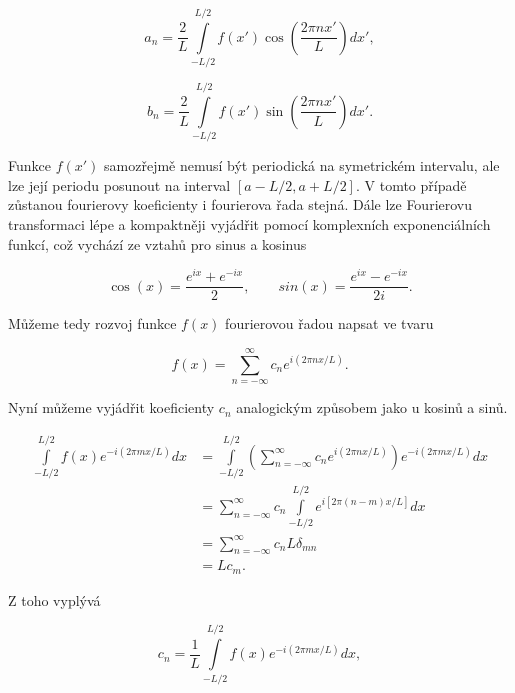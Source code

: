 \begin{equation}
a_n = \frac{2}{L} \int\limits_{-L/2}^{L/2} f(x') \cos \left( \frac{2 \pi n x'}{L} \right) dx',
\end{equation}

\begin{equation}
b_n = \frac{2}{L} \int\limits_{-L/2}^{L/2} f(x') \sin \left( \frac{2 \pi n x'}{L} \right) dx'.
\end{equation}

Funkce $f(x')$ samozřejmě nemusí být periodická na symetrickém intervalu, ale lze její periodu posunout na interval $[a-L/2,a+L/2]$. V tomto případě zůstanou fourierovy koeficienty i fourierova řada stejná. Dále lze Fourierovu transformaci lépe a kompaktněji vyjádřit pomocí komplexních exponenciálních funkcí, což vychází ze vztahů pro sinus a kosinus

\begin{equation}
\cos(x) = \frac{e^{ix} + e^{-ix}}{2}, \qquad sin(x) = \frac{e^{ix} - e^{-ix}}{2i}.
\end{equation}

Můžeme tedy rozvoj funkce $f(x)$ fourierovou řadou napsat ve tvaru

\begin{equation}\label{eq:fourier_rada}
f(x) = \sum\limits_{n=-\infty}^{\infty} c_n e^{i (2 \pi n x/L) }.
\end{equation}

Nyní můžeme vyjádřit koeficienty $c_n$ analogickým způsobem jako u kosinů a sinů.

\begin{equation}
\begin{aligned}
\int\limits_{-L/2}^{L/2} f(x) e^{-i (2 \pi m x/L)} dx & = \int\limits_{-L/2}^{L/2} \left(\sum\limits_{n=-\infty}^{\infty} c_n e^{i(2 \pi n x/L)} \right) e^{-i (2 \pi m x/L)} dx \\
& = \sum\limits_{n=-\infty}^{\infty} c_n \int\limits_{-L/2}^{L/2} e^{i[2 \pi (n-m) x/L]} dx \\
& = \sum\limits_{n=-\infty}^{\infty} c_n L \delta_{mn} \\
& = L c_m.
\end{aligned}
\end{equation}

Z toho vyplývá

\begin{equation}\label{eq:fourier_koef}
c_n = \frac{1}{L} \int\limits_{-L/2}^{L/2} f(x) e^{-i (2 \pi m x/L)} dx,
\end{equation}

